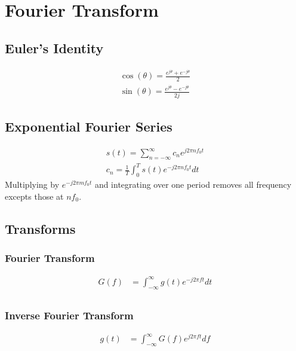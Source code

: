 \documentclass[oneside]{book}
\begin{document}
        \chapter{Fourier Transform}
            \section{Euler's Identity}
                \begin{align*}
                    \cos(\theta) = \frac{e^{j\theta} + e^{-j\theta}}{2}\\   
                    \sin(\theta) = \frac{e^{j\theta} - e^{-j\theta}}{2j}
                \end{align*}
            \section{Exponential Fourier Series}
                \begin{align*}
                    s(t) = \sum^{\infty}_{n=-\infty} c_n e^{j2\pi n f_0 t}\\
                    c_n = \frac{1}{T} \int^{T}_{0} s(t) e^{-j2\pi n f_0 t} dt
                \end{align*}
                Multiplying by $e^{-j2\pi m f_0 t}$ and integrating over one period removes all
                frequency excepts those at $nf_0$.
            \section{Transforms}
                \subsection{Fourier Transform}
                    \begin{align*}
                        G(f) &= \int^{\infty}_{-\infty} g(t) e^{-j2\pi f t} dt\\
                    \end{align*}
                \subsection{Inverse Fourier Transform}
                    \begin{align*}
                        g(t) &= \int^{\infty}_{-\infty} G(f) e^{j2\pi f t} df\\
                    \end{align*}
\end{document}
